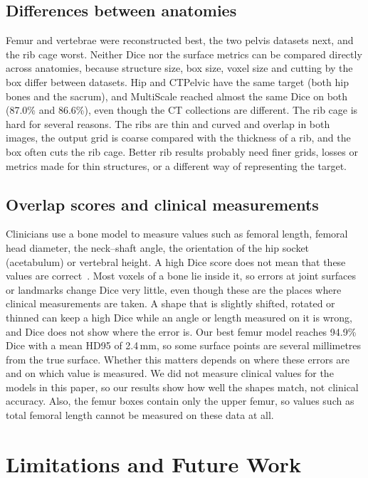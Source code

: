 \documentclass[11pt]{article}
\begin{document}
\subsection{Differences between anatomies}
Femur and vertebrae were reconstructed best, the two pelvis datasets next, and the rib cage worst. Neither Dice nor the surface metrics can be compared directly across anatomies, because structure size, box size, voxel size and cutting by the box differ between datasets. Hip and CTPelvic have the same target (both hip bones and the sacrum), and MultiScale reached almost the same Dice on both (87.0\% and 86.6\%), even though the CT collections are different. The rib cage is hard for several reasons. The ribs are thin and curved and overlap in both images, the output grid is coarse compared with the thickness of a rib, and the box often cuts the rib cage. Better rib results probably need finer grids, losses or metrics made for thin structures, or a different way of representing the target.

\subsection{Overlap scores and clinical measurements}\label{sec:clinical}
Clinicians use a bone model to measure values such as femoral length, femoral head diameter, the neck--shaft angle, the orientation of the hip socket (acetabulum) or vertebral height. A high Dice score does not mean that these values are correct~\cite{taha2015,maierhein2024}. Most voxels of a bone lie inside it, so errors at joint surfaces or landmarks change Dice very little, even though these are the places where clinical measurements are taken. A shape that is slightly shifted, rotated or thinned can keep a high Dice while an angle or length measured on it is wrong, and Dice does not show where the error is. Our best femur model reaches 94.9\% Dice with a mean HD95 of 2.4\,mm, so some surface points are several millimetres from the true surface. Whether this matters depends on where these errors are and on which value is measured. We did not measure clinical values for the models in this paper, so our results show how well the shapes match, not clinical accuracy. Also, the femur boxes contain only the upper femur, so values such as total femoral length cannot be measured on these data at all.

\section{Limitations and Future Work}\label{sec:limitations}
\end{document}
